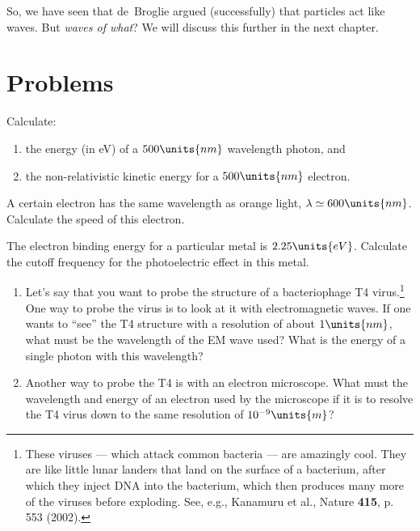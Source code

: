 So, we have seen that de~Broglie argued (successfully) that particles
act like waves.  But {\it waves of what}?  We will discuss this further
in the next chapter.

\vfill

\newpage

\section*{Problems}
\label{sec:beyond_classical_problems}


\begin{problem}
Calculate: 
\begin{enumerate}
\item the energy (in eV) of a $500\units{nm}$ wavelength photon,
and 
\item the non-relativistic kinetic energy for a $500\units{nm}$
electron.
\end{enumerate}
\label{prob:photonenergy}
\end{problem}

\begin{problem}
A certain electron has the same wavelength as orange light, $\lambda \simeq
600\units{nm}$.   Calculate the speed of this electron.
\end{problem}

\begin{problem}
The electron binding energy for a particular metal is
$2.25\units{eV}$.  Calculate the cutoff frequency for the
photoelectric effect in this metal.
\label{prob:cutoff_freq}
\end{problem}

\begin{problem}
\begin{enumerate}

\item Let's say that you want to probe the structure of a bacteriophage
T4 virus.\footnote{These viruses --- which attack common bacteria ---
are amazingly cool. They are like little lunar landers that land on the
surface of a bacterium, after which they inject DNA into the bacterium,
which then produces many more of the viruses before exploding.  See,
e.g., Kanamuru et al., Nature {\bf 415}, p. 553 (2002).} One way to probe
the virus is to look at it with electromagnetic waves.  If one wants
to ``see'' the T4 structure with a resolution of about 
$1\units{nm}$, what must be the wavelength of the EM wave used?
What is the energy of a single photon with this wavelength?

\item Another way to probe the T4 is with an electron microscope.
  What must the wavelength and energy of an electron used by the 
  microscope if it is to resolve the T4 virus down to the same resolution of
  $10^{-9}\units{m}$?
\end{enumerate}
\label{prob:T4virus}
\end{problem}

